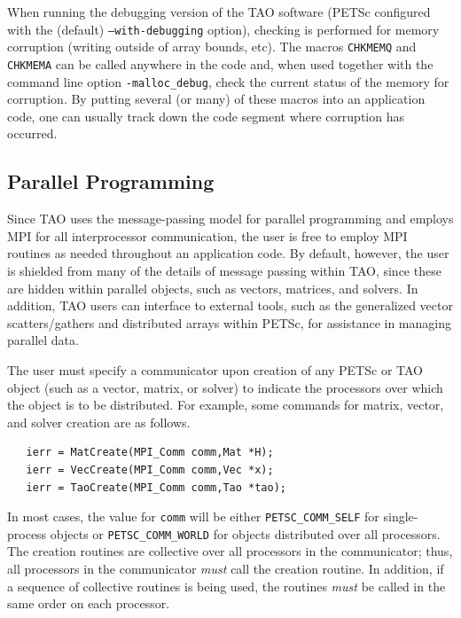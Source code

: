 \documentclass[]{book}
\begin{document}
When running the debugging version of the TAO software (PETSc configured 
with the (default) \texttt{--with-debugging} option), checking is performed for 
memory corruption
(writing outside of array bounds, etc). The macros \texttt{CHKMEMQ} and
\texttt{CHKMEMA} can be called anywhere in the code and, when used together 
with the command line option \texttt{-malloc\_debug}, check the current
status of the memory for corruption.  By putting several (or many) of
these macros into an application code, one can usually track
down the code segment where corruption has occurred.

\subsection*{Parallel Programming}

Since TAO uses the message-passing model for parallel programming and
employs MPI for all interprocessor communication, the user is free to
employ MPI routines as needed throughout an application code.
By default, however, the user is shielded from many of the details of
message passing within TAO, since these are hidden within parallel
objects, such as vectors, matrices, and solvers.  In addition, TAO
users can interface to external tools, such as the generalized vector
scatters/gathers and distributed arrays within PETSc, for assistance in
managing parallel data.

The user must specify a communicator
upon creation of any PETSc or TAO object (such as a vector, matrix, or 
solver)
to indicate the processors over which the object is to be distributed. 
For example, some commands for matrix, vector, and solver creation
are as follows.
\begin{verbatim}
   ierr = MatCreate(MPI_Comm comm,Mat *H);
   ierr = VecCreate(MPI_Comm comm,Vec *x);
   ierr = TaoCreate(MPI_Comm comm,Tao *tao); 
\end{verbatim}
\noindent
In most cases, the value for \texttt{comm} will be either 
\texttt{PETSC\_COMM\_SELF} for single-process objects or 
\texttt{PETSC\_COMM\_WORLD} for objects distributed over all processors.
The creation routines are collective over all processors in the
communicator; thus, all processors in the communicator {\em must} call
the creation routine.  In addition, if a sequence of collective
routines is being used, the routines {\em must} be called in the same
order on each processor.

%
%
\end{document}
